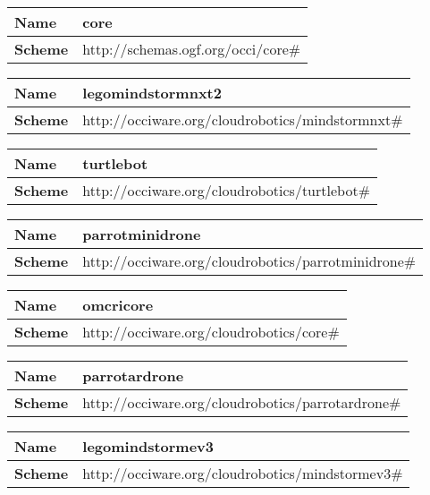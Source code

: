 \begin{center} 
\begin{tabular}{|l|l|}
  \hline
  \textbf{Name} & core \\
  \hline  
  \textbf{Scheme} & http://schemas.ogf.org/occi/core\# \\
  \hline
\end{tabular}
\end{center}
\begin{center} 
\begin{tabular}{|l|l|}
  \hline
  \textbf{Name} & legomindstormnxt2 \\
  \hline  
  \textbf{Scheme} & http://occiware.org/cloudrobotics/mindstormnxt\# \\
  \hline
\end{tabular}
\end{center}
\begin{center} 
\begin{tabular}{|l|l|}
  \hline
  \textbf{Name} & turtlebot \\
  \hline  
  \textbf{Scheme} & http://occiware.org/cloudrobotics/turtlebot\# \\
  \hline
\end{tabular}
\end{center}
\begin{center} 
\begin{tabular}{|l|l|}
  \hline
  \textbf{Name} & parrotminidrone \\
  \hline  
  \textbf{Scheme} & http://occiware.org/cloudrobotics/parrotminidrone\# \\
  \hline
\end{tabular}
\end{center}
\begin{center} 
\begin{tabular}{|l|l|}
  \hline
  \textbf{Name} & omcricore \\
  \hline  
  \textbf{Scheme} & http://occiware.org/cloudrobotics/core\# \\
  \hline
\end{tabular}
\end{center}
\begin{center} 
\begin{tabular}{|l|l|}
  \hline
  \textbf{Name} & parrotardrone \\
  \hline  
  \textbf{Scheme} & http://occiware.org/cloudrobotics/parrotardrone\# \\
  \hline
\end{tabular}
\end{center}
\begin{center} 
\begin{tabular}{|l|l|}
  \hline
  \textbf{Name} & legomindstormev3 \\
  \hline  
  \textbf{Scheme} & http://occiware.org/cloudrobotics/mindstormev3\# \\
  \hline
\end{tabular}
\end{center}


